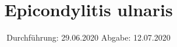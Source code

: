 

\subject{TPS Praktikum}
\title{Epicondylitis ulnaris}
\date{%
	Durchführung: 29.06.2020
	\hspace{3em}
	Abgabe: 12.07.2020
}



	\maketitle
	\thispagestyle{empty}
	\tableofcontents
	\newpage
	\setlength{\parindent}{0em}

	

	\newpage
	\printbibliography{}
	\nocite{*}



